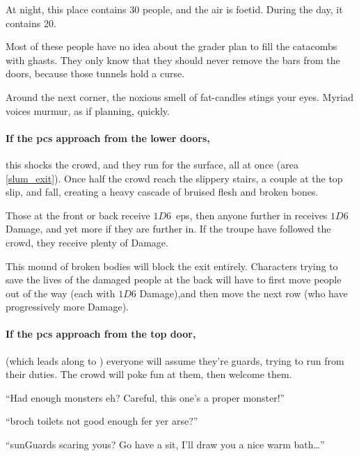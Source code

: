 \begin{multicols}{2}
At night, this place contains 30 people, and the air is foetid.
During the day, it contains 20.

Most of these people have no idea about the grader plan to fill the catacombs with ghasts.
They only know that they should never remove the bars from the doors, because those tunnels hold a curse.

\begin{boxtext}
  Around the next corner, the noxious smell of fat-candles stings your eyes.
  Myriad voices murmur, as if planning, quickly.
\end{boxtext}

\paragraph{If the \glspl{pc} approach from the lower doors,}
this shocks the crowd, and they run for the surface, all at once (\gls{area} \vref{slum_exit}).
Once half the crowd reach the slippery stairs, a couple at the top slip, and fall, creating a heavy cascade of bruised flesh and broken bones.

Those at the front or back receive $1D6$~\glspl{ep}, then anyone further in receives $1D6$ Damage, and yet more if they are further in.
If the troupe have followed the crowd, they receive plenty of Damage.

This mound of broken bodies will block the exit entirely.
Characters trying to save the lives of the damaged people at the back will have to first move people out of the way (each with $1D6$ Damage),and then move the next row (who have progressively more Damage).

\paragraph{If the \glspl{pc} approach from the top door,}
(which leads along to ) everyone will assume they're \glspl{guard}, trying to run from their duties.
The crowd will poke fun at them, then welcome them.

\null
\begin{speechtext}

  ``Had enough monsters eh?
  Careful, this one's a proper monster!''

  ``\Gls{broch} toilets not good enough fer yer arse?''

  ``\Glspl{sunGuard} scaring yous?
  Go have a sit, I'll draw you a nice warm bath\ldots''

\end{speechtext}


\end{multicols}
